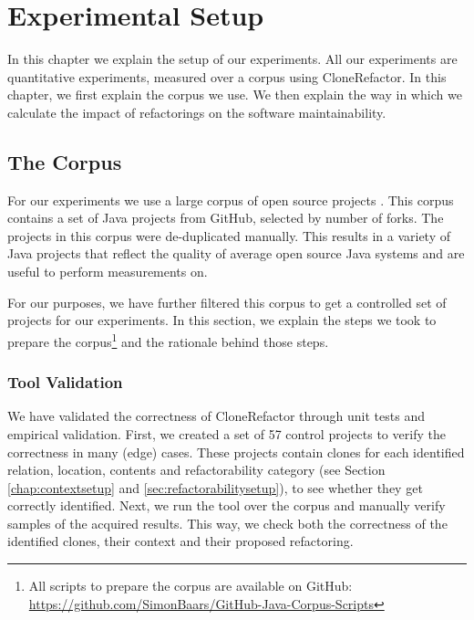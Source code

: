\chapter{Experimental Setup}\label{ch:experimentalsetup}
In this chapter we explain the setup of our experiments. All our experiments are quantitative experiments, measured over a corpus using CloneRefactor. In this chapter, we first explain the corpus we use. We then explain the way in which we calculate the impact of refactorings on the software maintainability.

\section{The Corpus}\label{chap:corpus}
For our experiments we use a large corpus of open source projects \cite{githubCorpus2013}. %
This corpus contains a set of Java projects from GitHub, selected by number of forks. The projects in this corpus were de-duplicated manually. %
This results in a variety of Java projects that reflect the quality of average open source Java systems and are useful to perform measurements on.

For our purposes, we have further filtered this corpus to get a controlled set of projects for our experiments. In this section,
we explain the steps we took to prepare the corpus\footnote{All scripts to prepare the corpus are available on GitHub: \url{https://github.com/SimonBaars/GitHub-Java-Corpus-Scripts}} and the rationale behind those steps. 

\subsection{Tool Validation}
We have validated the correctness of CloneRefactor through unit tests and empirical validation. First, we created a set of 57 control projects to verify the correctness in many (edge) cases. These projects contain clones for each identified relation, location, contents and refactorability category (see Section \ref{chap:contextsetup} and \ref{sec:refactorabilitysetup}), %
to see whether they get correctly identified. Next, we run the tool over the corpus and manually verify samples of the acquired results. This way, we check both the correctness of the identified clones, their context and their proposed refactoring.

